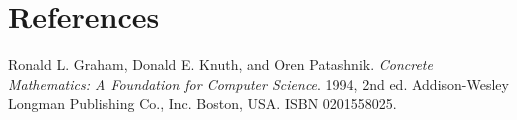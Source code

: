 \section{References}

\begin{thebibliography}{9} %


Ronald L. Graham, Donald E. Knuth, and Oren Patashnik. \emph{Concrete
Mathematics: A Foundation for Computer Science}. 1994, 2nd ed. Addison-Wesley
Longman Publishing Co., Inc. Boston, USA. ISBN 0201558025.

\end{thebibliography}